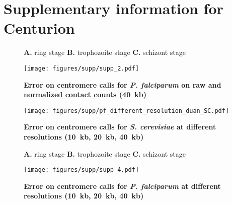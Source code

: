 \chapter{Supplementary information for Centurion}

\graphicspath{{8_centurion_supplementaries/}}


\begin{figure}[ht!]
\caption{\textbf{Error on centromere calls for \textit{P. falciparum} on raw
and normalized contact counts (40~kb)}}{
\textbf{A.} ring stage \textbf{B.}
trophozoite stage \textbf{C.} schizont stage}
\begin{center}
\texttt{[image: figures/supp/supp\_2.pdf]}
\end{center}
\label{suppfig:raw_vs_normed_pf}
\end{figure}

\clearpage

\begin{figure}[ht!]
\caption{\textbf{Error on centromere calls for \textit{S. cerevisiae}
at different resolutions (10~kb, 20~kb, 40~kb)}}
\begin{center}
\texttt{[image: figures/supp/pf\_different\_resolution\_duan\_SC.pdf]}
\end{center}
\label{suppfig:error_diff_res_sc}
\end{figure}


\begin{figure}[ht!]
\caption{\textbf{Error on centromere calls for \textit{P. falciparum}
at different resolutions (10~kb, 20~kb, 40~kb)}}
{\textbf{A.} ring stage \textbf{B.} trophozoite stage \textbf{C.} schizont stage}
\begin{center}
\texttt{[image: figures/supp/supp\_4.pdf]}
\end{center}
\label{suppfig:error_diff_res_pf}
\end{figure}

\clearpage

